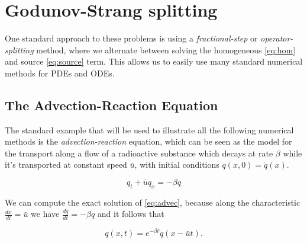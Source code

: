 \documentclass[journal,onecolumn]{IEEEtran}
\begin{document}




\section{Godunov-Strang splitting}

One standard approach to these problems is using a \textit{fractional-step} or \textit{operator-splitting} method, where we alternate between solving the homogeneous \eqref{eq:hom} and source \eqref{eq:source} term. This allows us to easily use many standard numerical methods for PDEs and ODEs.

\subsection{The Advection-Reaction Equation}

The standard example that will be used to illustrate all the following numerical methods is the \textit{advection-reaction} equation, which can be seen as the model for the transport along a flow of a radioactive substance which decays at rate $\beta$ while it's transported at constant speed $\bar{u}$, with initial conditions $q(x,0)= \mathring{q}(x)$.

\begin{equation}\label{eq:advec}
	q_t + \bar{u}q_x=-\beta q
\end{equation}

We can compute the exact solution of \eqref{eq:advec}, because along the characteristic $\frac{dx}{dt}=\bar{u}$ we have $\frac{dq}{dt}=-\beta q$ and it follows that

\begin{equation}\label{eq:advec_sol}
	q(x,t) = e^{-\beta t}\mathring{q}(x-\bar{u}t).
\end{equation}
\end{document}
